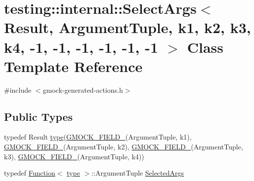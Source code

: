 \hypertarget{classtesting_1_1internal_1_1_select_args_3_01_result_00_01_argument_tuple_00_01k1_00_01k2_00_01k7cadbb88f40ff7408f8c070bb61c70db}{}\section{testing\+::internal\+::Select\+Args$<$ Result, Argument\+Tuple, k1, k2, k3, k4, -\/1, -\/1, -\/1, -\/1, -\/1, -\/1 $>$ Class Template Reference}
\label{classtesting_1_1internal_1_1_select_args_3_01_result_00_01_argument_tuple_00_01k1_00_01k2_00_01k7cadbb88f40ff7408f8c070bb61c70db}


{\ttfamily \#include $<$gmock-\/generated-\/actions.\+h$>$}

\subsection*{Public Types}
\begin{DoxyCompactItemize}
\item 
typedef Result \mbox{\hyperlink{classtesting_1_1internal_1_1_select_args_3_01_result_00_01_argument_tuple_00_01k1_00_01k2_00_01k7cadbb88f40ff7408f8c070bb61c70db_a9c0ad299bbbc5468d4c3dc396f337bf5}{type}}(\mbox{\hyperlink{_obj__test_2lib_2googletest-release-1_88_81_2googlemock_2include_2gmock_2gmock-generated-actions_8h_a6eb3ce92b0613603057a20ec9e593317}{G\+M\+O\+C\+K\+\_\+\+F\+I\+E\+L\+D\+\_\+}}(Argument\+Tuple, k1), \mbox{\hyperlink{_obj__test_2lib_2googletest-release-1_88_81_2googlemock_2include_2gmock_2gmock-generated-actions_8h_a6eb3ce92b0613603057a20ec9e593317}{G\+M\+O\+C\+K\+\_\+\+F\+I\+E\+L\+D\+\_\+}}(Argument\+Tuple, k2), \mbox{\hyperlink{_obj__test_2lib_2googletest-release-1_88_81_2googlemock_2include_2gmock_2gmock-generated-actions_8h_a6eb3ce92b0613603057a20ec9e593317}{G\+M\+O\+C\+K\+\_\+\+F\+I\+E\+L\+D\+\_\+}}(Argument\+Tuple, k3), \mbox{\hyperlink{_obj__test_2lib_2googletest-release-1_88_81_2googlemock_2include_2gmock_2gmock-generated-actions_8h_a6eb3ce92b0613603057a20ec9e593317}{G\+M\+O\+C\+K\+\_\+\+F\+I\+E\+L\+D\+\_\+}}(Argument\+Tuple, k4))
\item 
typedef \mbox{\hyperlink{structtesting_1_1internal_1_1_function}{Function}}$<$ \mbox{\hyperlink{classtesting_1_1internal_1_1_select_args_3_01_result_00_01_argument_tuple_00_01k1_00_01k2_00_01k7cadbb88f40ff7408f8c070bb61c70db_a9c0ad299bbbc5468d4c3dc396f337bf5}{type}} $>$\+::Argument\+Tuple \mbox{\hyperlink{classtesting_1_1internal_1_1_select_args_3_01_result_00_01_argument_tuple_00_01k1_00_01k2_00_01k7cadbb88f40ff7408f8c070bb61c70db_a43b23530d7b427507a4905800f01548b}{Selected\+Args}}
\end{DoxyCompactItemize}
